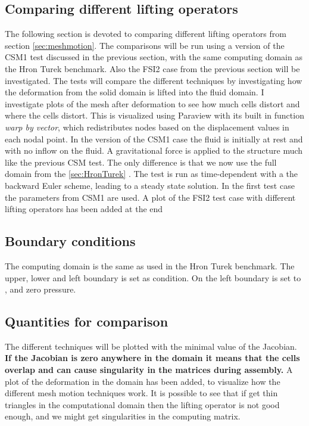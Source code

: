 \subsection{Comparing different lifting operators}\label{sec:mesh_motion}
The following section is devoted to comparing different lifting operators from section \ref{sec:meshmotion}. The comparisons will be run using a version of the CSM1 test discussed in the previous section, with the same computing domain as the Hron Turek benchmark. Also the FSI2 case from the previous section will be investigated. The tests will compare the different techniques by investigating how the deformation from the solid domain is lifted into the fluid domain. I investigate plots of the mesh after deformation to see how much cells distort and where the cells distort. This is visualized using Paraview with its built in function \textit{warp by vector}, which redistributes nodes based on the displacement values in each nodal point.\newline
In the version of the CSM1 case the fluid is initially at rest and with no inflow on the fluid. A gravitational force is applied to the structure much like the previous CSM test. The only difference is that we now use the full domain from the \ref{sec:HronTurek} . The test is run as time-dependent with a the backward Euler scheme, leading to a steady state solution. In the first test case the parameters from CSM1 are used. \newline
A plot of the FSI2 test case with different lifting operators has been added at the end

\subsection*{Boundary conditions}
The computing domain is the same as used in the Hron Turek benchmark.
The upper, lower and left boundary is set as  condition. On the left boundary is set to , and zero pressure. 
\subsection*{Quantities for comparison}
The different techniques will be plotted with the minimal value of the Jacobian. \textbf{If the Jacobian is zero anywhere in the domain it means that the cells overlap and can cause singularity in the matrices during assembly.} \newline
A plot of the deformation in the domain has been added, to visualize how the different mesh motion techniques work. It is possible to see that if get thin triangles in the computational domain then the lifting operator is not good enough, and we might get singularities in the computing matrix.
